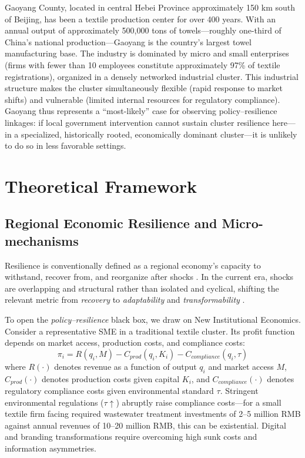 \documentclass[a4paper, twoside, final]{article}
\begin{document}
Gaoyang County, located in central Hebei Province approximately 150 km south of Beijing, has been a textile production center for over 400 years. With an annual output of approximately 500,000 tons of towels---roughly one-third of China's national production---Gaoyang is the country's largest towel manufacturing base. The industry is dominated by micro and small enterprises (firms with fewer than 10 employees constitute approximately 97\% of textile registrations), organized in a densely networked industrial cluster. This industrial structure makes the cluster simultaneously flexible (rapid response to market shifts) and vulnerable (limited internal resources for regulatory compliance). Gaoyang thus represents a ``most-likely'' case for observing policy--resilience linkages: if local government intervention cannot sustain cluster resilience here---in a specialized, historically rooted, economically dominant cluster---it is unlikely to do so in less favorable settings.

\section{Theoretical Framework}\label{sec:theory}

\subsection{Regional Economic Resilience and Micro-mechanisms}
Resilience is conventionally defined as a regional economy's capacity to withstand, recover from, and reorganize after shocks \citep{Martin2012, Martin2015, Boschma2015}. In the current era, shocks are overlapping and structural rather than isolated and cyclical, shifting the relevant metric from \emph{recovery} to \emph{adaptability} and \emph{transformability} \citep{Bristow2014, Sutton2023}.

To open the \emph{policy--resilience} black box, we draw on New Institutional Economics. Consider a representative SME in a traditional textile cluster. Its profit function depends on market access, production costs, and compliance costs:
\begin{equation}
    \pi_i = R(q_i, M) - C_{prod}(q_i, K_i) - C_{compliance}(q_i, \tau)
\end{equation}
where $R(\cdot)$ denotes revenue as a function of output $q_i$ and market access $M$, $C_{prod}(\cdot)$ denotes production costs given capital $K_i$, and $C_{compliance}(\cdot)$ denotes regulatory compliance costs given environmental standard $\tau$. Stringent environmental regulations ($\tau \uparrow$) abruptly raise compliance costs---for a small textile firm facing required wastewater treatment investments of 2--5 million RMB against annual revenues of 10--20 million RMB, this can be existential. Digital and branding transformations require overcoming high sunk costs and information asymmetries.
\end{document}
